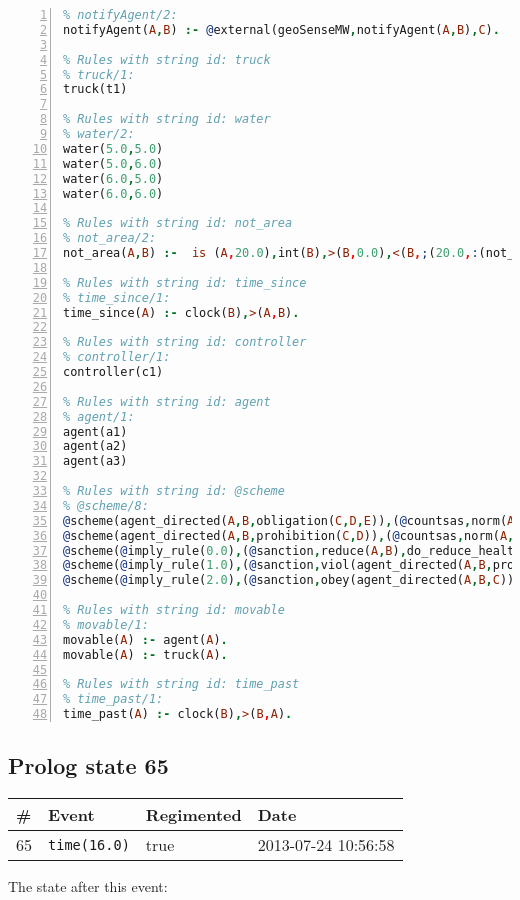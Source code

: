\documentclass[11pt]{article}\usepackage[utf8]{inputenc}\usepackage{geometry}
\begin{document}
\begin{lstlisting}[language=Prolog, numbers=left]
% Rules with string id: notifyAgent
% notifyAgent/2:
notifyAgent(A,B) :- @external(geoSenseMW,notifyAgent(A,B),C).

% Rules with string id: truck
% truck/1:
truck(t1)

% Rules with string id: water
% water/2:
water(5.0,5.0)
water(5.0,6.0)
water(6.0,5.0)
water(6.0,6.0)

% Rules with string id: not_area
% not_area/2:
not_area(A,B) :-  is (A,20.0),int(B),>(B,0.0),<(B,;(20.0,:(not_area(A,B), is (-(B),20.0)))),int(A),>(A,0.0),<(A,;(20.0,:(area(A,B),-(int(A))))),int(B),>(A,0.0),>(B,0.0),<(A,21.0),<(B,21.0).

% Rules with string id: time_since
% time_since/1:
time_since(A) :- clock(B),>(A,B).

% Rules with string id: controller
% controller/1:
controller(c1)

% Rules with string id: agent
% agent/1:
agent(a1)
agent(a2)
agent(a3)

% Rules with string id: @scheme
% @scheme/8:
@scheme(agent_directed(A,B,obligation(C,D,E)),(@countsas,norm(A,B,F,obligation(C,D,E)),F),false,(listTrue(C)),(time_past(D)),false,[plus(viol(agent_directed(A,B,obligation(C,D,E))))|[]],[plus(obey(agent_directed(A,B,obligation(C,D,E))))|[]])
@scheme(agent_directed(A,B,prohibition(C,D)),(@countsas,norm(A,B,E,prohibition(C,D)),E),(listTrue(C)),false,(false),false,[plus(viol(agent_directed(A,B,prohibition(C,D))))|[]],[plus(obey(agent_directed(A,B,prohibition(C,D))))|[]])
@scheme(@imply_rule(0.0),(@sanction,reduce(A,B),do_reduce_health(A,B),notifyAgent(A,changed(status))),true,false,false,false,[min(reduce(A,B))|[]],[])
@scheme(@imply_rule(1.0),(@sanction,viol(agent_directed(A,B,prohibition(C,D))),do_sanction(D)),true,false,false,false,[min(viol(agent_directed(A,B,prohibition(C,D))))|[]],[])
@scheme(@imply_rule(2.0),(@sanction,obey(agent_directed(A,B,C))),true,false,false,false,[min(obey(agent_directed(A,B,C)))|[]],[])

% Rules with string id: movable
% movable/1:
movable(A) :- agent(A).
movable(A) :- truck(A).

% Rules with string id: time_past
% time_past/1:
time_past(A) :- clock(B),>(B,A).

\end{lstlisting}
\clearpage 
\subsection{Prolog state 65}
\begin{table}[ht]
\centering 
\begin{tabular}{l l l l} 
\textbf{\#} & \textbf{Event} & \textbf{Regimented} & \textbf{Date} \\ [0.5ex] 
\hline
65&\texttt{time(16.0)}&true&2013-07-24 10:56:58\\ [1ex] \hline\end{tabular}
\end{table}
The state after this event:
\end{document}
